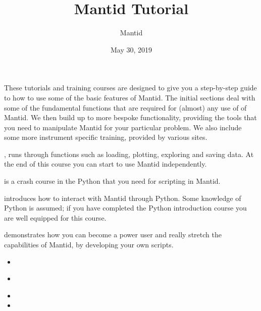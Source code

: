 \documentclass[letterpaper,10pt,english,openany]{sphinxmanual}
\title{Mantid Tutorial}
\date{May 30, 2019}
\author{Mantid}
\let\sphinxpxdimen\pdfpxdimen\else\newdimen\sphinxpxdimen
\begin{document}
\pagestyle{empty}
\sphinxmaketitle
\pagestyle{plain}
\sphinxtableofcontents
\pagestyle{normal}
\label{\detokenize{index::doc}}


These tutorials and training courses are designed to give you a step-by-step guide to how to use some of the basic features of Mantid.
The initial sections deal with some of the fundamental functions that are required for (almost) any use of of Mantid. We then build
up to more bespoke functionality, providing the tools that you need to manipulate Mantid for your particular problem. We also
include some more instrument specific training, provided by various sites.

, runs through functions such as loading, plotting, exploring and saving data.
At the end of this course you can start to use Mantid independently.

 is a crash course in the Python that you need for scripting in Mantid.

 introduces how to interact with Mantid through Python. Some knowledge of
Python is assumed; if you have completed the Python introduction course you are well equipped
for this course.

 demonstrates how you can become a power user and really stretch the
capabilities of Mantid, by developing your own scripts.


\noindent{\hspace*{\fill}\sphinxincludegraphics[width=200\sphinxpxdimen]{{mantid}.png}}
\begin{itemize}
\item {} 
{\hyperref[\detokenize{mantid_basic_course/index:mantid-basic-course}]{}}

\item {} 
{\hyperref[\detokenize{introduction_to_python/index:introduction-to-python}]{}}

\item {} 

\item {} 

\end{itemize}
\end{document}
